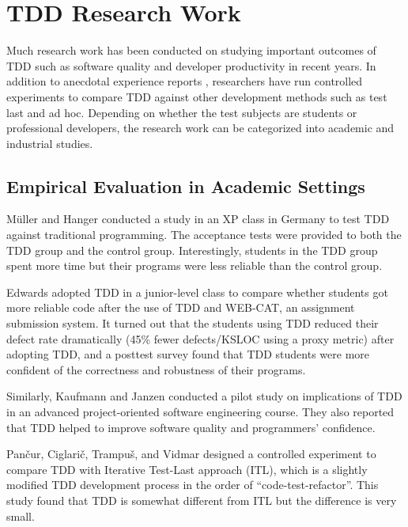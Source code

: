 %

\section{TDD Research Work}
\label{sec:related-empirical}

Much research work has been conducted on studying important
outcomes of TDD such as software quality and developer productivity 
in recent years. In addition to anecdotal experience reports
\cite{George:04,Maximilien:03,Williams:03,Kaufmann:03,Edwards:04,Bhat:06}, 
researchers have run controlled experiments 
\cite{Muller:02,Matjaz:03,Erdogmus:05} to compare TDD against other 
development methods such as test last and ad hoc. Depending on whether
the test subjects are students or professional developers, the research
work can be categorized into academic and industrial studies.

\subsection{Empirical Evaluation in Academic Settings}

M\"{u}ller and Hanger \cite{Muller:02} conducted a study in an 
XP class in Germany to test TDD against traditional programming. 
The acceptance tests were provided 
to both the TDD group and the control group. Interestingly, students 
in the TDD group spent more time but their programs were less reliable 
than the control group.  

Edwards \cite{Edwards:04} adopted TDD in a junior-level class to compare
whether students got more reliable code after the use of TDD and WEB-CAT,
an assignment submission system. It turned out that the students using TDD
reduced their defect rate dramatically (45\% fewer defects/KSLOC using a
proxy metric) after adopting TDD, and a posttest survey found that TDD
students were more confident of the correctness and robustness of their
programs.

Similarly, Kaufmann and Janzen \cite{Kaufmann:03} conducted a pilot study 
on implications of TDD in an advanced project-oriented software 
engineering course. They also reported that TDD helped to improve software 
quality and programmers' confidence.

Pan\v{c}ur, Ciglari\v{c}, Trampu\v{s}, and Vidmar \cite{Matjaz:03} designed 
a controlled experiment to compare TDD with Iterative Test-Last approach 
(ITL), which is a slightly modified TDD development process in the order 
of ``code-test-refactor''.  This study
found that TDD is somewhat different from ITL but the difference is very
small. 

